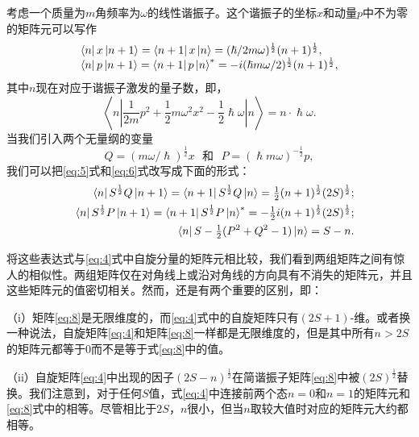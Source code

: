 \documentclass{article}
\begin{document}
考虑一个质量为$m$角频率为$\omega$的线性谐振子。这个谐振子的坐标$x$和动量$p$中不为零的矩阵元可以写作
\begin{equation} \label{eq:5}
\begin{array}{l}
\bra{n}x\ket{n+1}=\bra{n+1}x\ket{n}=(\hslash/2m\omega)^{\frac{1}{2}}(n+1)^{\frac{1}{2}},\\
\bra{n}p\ket{n+1}=\bra{n+1}p\ket{n}^*=-i(\hslash m\omega/2)^{\frac{1}{2}}(n+1)^{\frac{1}{2}},
\end{array}
\end{equation}
其中$n$现在对应于谐振子激发的量子数，即，
\begin{equation} \label{eq:6}
\left<n\left|\frac{1}{2m}p^2+\frac{1}{2}m\omega^2x^2-\frac{1}{2}\hslash\omega\right|n\right>=n\cdot\hslash\omega.
\end{equation}
当我们引入两个无量纲的变量
\begin{equation} \label{eq:7}
Q=(m\omega/\hslash)^{\frac{1}{2}}x\text{~~和~~}P=(\hslash m\omega)^{-\frac{1}{2}}p,
\end{equation}
我们可以把\eqref{eq:5}式和\eqref{eq:6}式改写成下面的形式：
\begin{eqnarray} \label{eq:8}
&&\bra{n}S^{\frac{1}{2}}Q\ket{n+1}=\bra{n+1}S^{\frac{1}{2}}Q\ket{n}=\tfrac{1}{2}(n+1)^{\frac{1}{2}}(2S)^{\frac{1}{2}};\nonumber\\
&&\bra{n}S^{\frac{1}{2}}P\ket{n+1}=\bra{n+1}S^{\frac{1}{2}}P\ket{n}^*=-\tfrac{1}{2}i(n+1)^{\frac{1}{2}}(2S)^{\frac{1}{2}};\\
&&\bra{n}S-\tfrac{1}{2}(P^2+Q^2-1)\ket{n}=S-n.\nonumber
\end{eqnarray}

将这些表达式与\eqref{eq:4}式中自旋分量的矩阵元相比较，我们看到两组矩阵之间有惊人的相似性。两组矩阵仅在对角线上或沿对角线的方向具有不消失的矩阵元，并且这些矩阵元的值密切相关。然而，还是有两个重要的区别，即：

（i）矩阵\eqref{eq:8}是无限维度的，而\eqref{eq:4}式中的自旋矩阵只有$(2S+1)$-维。或者换一种说法，自旋矩阵\eqref{eq:4}和矩阵\eqref{eq:8}一样都是无限维度的，但是其中所有$n>2S$的矩阵元都等于$0$而不是等于式\eqref{eq:8}中的值。

（ii）自旋矩阵\eqref{eq:4}中出现的因子$(2S-n)^\frac{1}{2}$在简谐振子矩阵\eqref{eq:8}中被$(2S)^\frac{1}{2}$替换。我们注意到，对于任何$S$值，式\eqref{eq:4}中连接前两个态$n=0$和$n=1$的矩阵元和\eqref{eq:8}式中的相等。尽管相比于$2S$，$n$很小，但当$n$取较大值时对应的矩阵元大约都相等。
\end{document}
